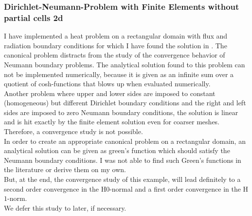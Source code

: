 \documentclass[a4paper,12pt]{article}
\begin{document}
\subsubsection{Dirichlet-Neumann-Problem with Finite Elements without partial cells 2d}
I have implemented a heat problem on a rectangular domain with flux and radiation boundary conditions for which I have found the solution in \cite{Carlslaw}. The canonical problem
distracts from the study of the convergence behavior of Neumann boundary problems. The analytical solution found to this problem
can not be implemented numerically, because it is given as an infinite sum over a quotient of cosh-functions that blows up when evaluated numerically.\\
Another problem where upper and lower sides are imposed to constant (homogeneous) but different Dirichlet boundary conditions and the right and left sides are imposed to zero Neumann boundary conditions, the solution is linear and is hit exactly by the finite element
solution even for coarser meshes. Therefore, a convergence study is not possible.\\
In order to create an appropriate canonical problem on a rectangular domain, an analytical solution can be given as green's function which should satisfy the Neumann boundary conditions. I was not able to find such Green's functions in the literature or derive them on my own.\\
But, at the end, the convergence study of this example, will lead definitely to a second order convergence in the H$0$-normal and a first order
convergence in the H$1$-norm.\\
We defer this study to later, if necessary.    
\end{document}

